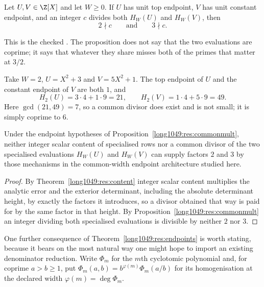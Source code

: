 \begin{proposition}\label{long1049:res:commonmult}
Let \(U,V\in\Z[X]\) and let \(W\ge0\).  If \(U\) has unit top endpoint, \(V\)
has unit constant endpoint, and an integer
\(c\) divides both \(H_W(U)\) and \(H_W(V)\), then
\[
 2\nmid c\qquad\text{and}\qquad 3\nmid c.
\]
\end{proposition}

\noindent This is the checked
.  The proposition does not say that the two evaluations are coprime;
it says that whatever they share misses both of the primes that matter at
\(3/2\).

\begin{example}\label{long1049:ex:commonmult}
Take \(W=2\), \(U=X^2+3\) and \(V=5X^2+1\).  The top endpoint of \(U\) and the
constant endpoint of \(V\) are both \(1\), and
\[
 H_2(U)=3\cdot4+1\cdot9=21,\qquad H_2(V)=1\cdot4+5\cdot9=49 .
\]
Here \(\gcd(21,49)=7\), so a common divisor does exist and is not small; it
is simply coprime to \(6\).
\end{example}

\begin{corollary}\label{long1049:res:nomult}
Under the endpoint hypotheses of Proposition~\ref{long1049:res:commonmult}, neither
integer scalar content of specialised rows nor a common divisor of the two specialised
evaluations \(H_W(U)\) and \(H_W(V)\) can supply factors \(2\) and \(3\) by
those mechanisms in the common-width endpoint architecture studied here.
\end{corollary}

\begin{proof}
By Theorem~\ref{long1049:res:content} integer scalar content multiplies the analytic error and
the exterior determinant, including the absolute determinant height, by exactly
the factors it introduces, so a divisor obtained that way is paid for by the
same factor in that height.  By Proposition~\ref{long1049:res:commonmult} an integer
dividing both specialised evaluations is divisible by neither \(2\) nor \(3\).
\end{proof}

One further consequence of Theorem~\ref{long1049:res:endpoints} is worth stating,
because it bears on the most natural way one might hope to import an existing
denominator reduction.  Write $\Phi_m$ for the $m$th cyclotomic polynomial and,
for coprime $a>b\ge1$, put $\Phi_m(a,b)=b^{\varphi(m)}\Phi_m(a/b)$ for its
homogenisation at the declared width $\varphi(m)=\deg\Phi_m$.


